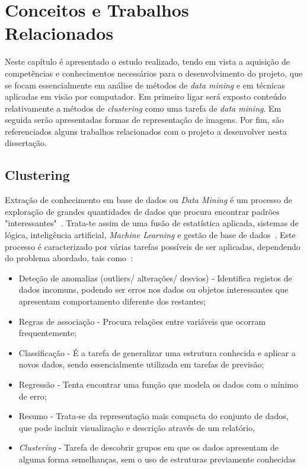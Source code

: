 
\chapter{Conceitos e Trabalhos Relacionados} \label{chap:estarte}

Neste capítulo é apresentado o estudo realizado, tendo em vista a aquisição de competências e conhecimentos necessários para o desenvolvimento do projeto, que se focam essencialmente em análise de métodos de \textit{data mining} e em técnicas aplicadas em visão por computador. Em primeiro ligar será exposto conteúdo relativamente a métodos de \textit{clustering} como uma tarefa de \textit{data mining}. Em seguida serão apresentadas formas de representação de imagens. Por fim, são referenciados alguns trabalhos relacionados com o projeto a desenvolver nesta dissertação.

\section{Clustering} \label{sec:cluster}

Extração de conhecimento em base de dados ou \textit{Data Mining} é um processo de exploração de grandes quantidades de dados que procura encontrar padrões "interessantes"~\citet{Han2006}. Trata-te assim de uma fusão de estatística aplicada, sistemas de lógica, inteligência artificial, \textit{Machine Learning} e gestão de base de dados~\citet{North2012}. Este processo é caracterizado por várias tarefas possíveis de ser aplicadas, dependendo do problema abordado, tais como~\citep{Fayyad1996}:

\begin{itemize}
\item Deteção de anomalias (outliers/ alterações/ desvios) - Identifica registos de dados incomuns, podendo ser erros nos dados ou objetos interessantes que apresentam comportamento diferente dos restantes;
\item Regras de associação - Procura relações entre variáveis que ocorram frequentemente;
\item Classificação - É a tarefa de generalizar uma estrutura conhecida e aplicar a novos dados, sendo essencialmente utilizada em tarefas de previsão;
\item Regressão - Tenta encontrar uma função que modela os dados com o mínimo de erro;
\item Resumo - Trata-se da representação mais compacta do conjunto de dados, que pode incluir visualização e descrição através de um relatório,
\item \textit{Clustering} - Tarefa de descobrir grupos em que os dados apresentam de alguma forma semelhanças, sem o uso de estruturas previamente conhecidas
\end{itemize}

